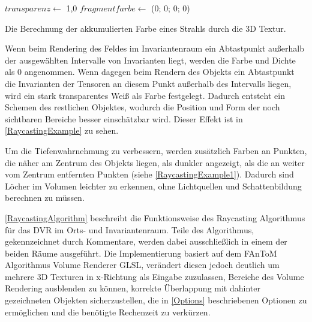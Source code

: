 \documentclass[a4paper,fontsize=12pt,toc=bib,parskip=half,ngerman]{scrartcl}
\begin{document}
\begin{algorithm}[t]
	$transparenz\gets$ 1,0\;
	$fragmentfarbe\gets$ (0; 0; 0; 0)\;
	\vspace{0.5cm}
	\caption{Die Berechnung der akkumulierten Farbe eines Strahls durch die 3D Textur.}
	\label{RaycastingAlgorithm}
\end{algorithm}

Wenn beim Rendering des Feldes im Invariantenraum ein Abtastpunkt au{\ss}erhalb der ausgew\"ahlten Intervalle von Invarianten liegt, werden die Farbe und Dichte als 0 angenommen. Wenn dagegen beim Rendern des Objekts ein Abtastpunkt die Invarianten der Tensoren an diesem Punkt au{\ss}erhalb des Intervalls liegen, wird ein stark transparentes Wei{\ss} als Farbe festgelegt. Dadurch entsteht ein Schemen des restlichen Objektes, wodurch die Position und Form der noch sichtbaren Bereiche besser einsch\"atzbar wird. Dieser Effekt ist in \cref{RaycastingExample} zu sehen. 

Um die Tiefenwahrnehmung zu verbessern, werden zus\"atzlich Farben an Punkten, die n\"aher am Zentrum des Objekts liegen, als dunkler angezeigt, als die an weiter vom Zentrum entfernten Punkten (siehe \cref{RaycastingExample1}). Dadurch sind L\"ocher im Volumen leichter zu erkennen, ohne Lichtquellen und Schattenbildung berechnen zu m\"ussen.

\cref{RaycastingAlgorithm} beschreibt die Funktionsweise des Raycasting Algorithmus f\"ur das DVR im Orts- und Invariantenraum. Teile des Algorithmus, gekennzeichnet durch Kommentare, werden dabei ausschlie{\ss}lich in einem der beiden R\"aume ausgef\"uhrt. Die Implementierung basiert auf dem FAnToM Algorithmus \glq Volume Renderer GLSL\grq{}, ver\"andert diesen jedoch deutlich um mehrere 3D Texturen in x-Richtung als Eingabe zuzulassen, Bereiche des Volume Rendering ausblenden zu k\"onnen, korrekte \"Uberlappung mit dahinter gezeichneten Objekten sicherzustellen, die in \cref{Options} beschriebenen Optionen zu erm\"oglichen und die ben\"otigte Rechenzeit zu verk\"urzen.
\end{document}
